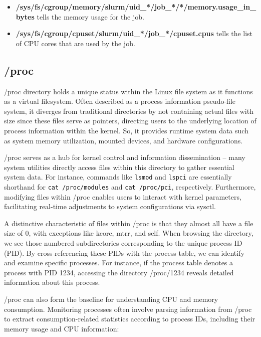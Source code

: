 \begin{itemize}
    \item \textbf{/sys/fs/cgroup/memory/slurm/uid\_*/job\_*/*/memory.usage\_in\_bytes} tells the memory usage for the job.
    \item \textbf{/sys/fs/cgroup/cpuset/slurm/uid\_*/job\_*/cpuset.cpus} tells the list of CPU cores that are used by the job.
\end{itemize}

\subsection{/proc}
/proc \cite{5544096} directory holds a unique status within the Linux file system as it functions as a virtual filesystem. Often described as a process information pseudo-file system, it diverges from traditional directories by not containing actual files with size since these files serve as pointers, directing users to the underlying location of process information within the kernel. So, it provides runtime system data such as system memory utilization, mounted devices, and hardware configurations.

/proc serves as a hub for kernel control and information dissemination -- many system utilities directly access files within this directory to gather essential system data. For instance, commands like \texttt{lsmod} and \texttt{lspci} are essentially shorthand for \texttt{cat /proc/modules} and \texttt{cat /proc/pci}, respectively. Furthermore, modifying files within /proc enables users to interact with kernel parameters, facilitating real-time adjustments to system configurations via sysctl.

A distinctive characteristic of files within /proc is that they almost all have a file size of 0, with exceptions like kcore, mtrr, and self. When browsing the directory, we see those numbered subdirectories corresponding to the unique process ID (PID). By cross-referencing these PIDs with the process table, we can identify and examine specific processes. For instance, if the process table denotes a process with PID 1234, accessing the directory /proc/1234 reveals detailed information about this process.
    
/proc can also form the baseline for understanding CPU and memory consumption. Monitoring processes often involve parsing information from /proc to extract consumption-related statistics according to process IDs, including their memory usage and CPU information:


